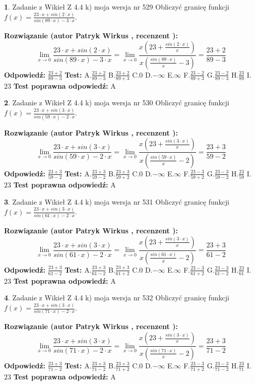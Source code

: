 \documentclass[12pt, a4paper]{article}
\theoremstyle{definition} %
\newtheorem{zad}{}
\newcommand{\zadStart}[1]{\begin{zad}#1\newline}
\newcommand{\zadStop}{\end{zad}}
\newcommand{\rozwStart}[2]{\noindent \textbf{Rozwiązanie (autor #1 , recenzent #2): }\newline}
\newcommand{\rozwStop}{\newline}
\newcommand{\odpStart}{\noindent \textbf{Odpowiedź:}\newline}
\newcommand{\odpStop}{\newline}
\newcommand{\testStart}{\noindent \textbf{Test:}\newline}
\newcommand{\testStop}{\newline}
\newcommand{\kluczStart}{\noindent \textbf{Test poprawna odpowiedź:}\newline}
\newcommand{\kluczStop}{\newline}
\begin{document}
\zadStart{Zadanie z Wikieł Z 4.4 k) moja wersja nr 529}
Obliczyć granicę funkcji $f(x)=\frac{23\cdot x +sin(2\cdot x)}{sin(89\cdot x) -3\cdot x}$.
\zadStop
\rozwStart{Patryk Wirkus}{}
$$\lim\limits_{x\to 0}\frac{23\cdot x +sin(2\cdot x)}{sin(89\cdot x) -3\cdot x}
=\lim\limits_{x\to 0}\frac{x(23+\frac{sin(2\cdot x)}{x})}{x(\frac{sin(89\cdot x)}{x}-3)}
=\frac{23+2}{89-3}$$
\rozwStop
\odpStart
$\frac{23+2}{89-3}$
\odpStop
\testStart
A.$\frac{23+2}{89-3}$
B.$\frac{23+2}{89+3}$
C.$0$
D.$-\infty$
E.$\infty$
F.$\frac{23-2}{89+3}$
G.$\frac{23-2}{89-3}$
H.$\frac{23}{89}$
I.$23$
\testStop
\kluczStart
A
\kluczStop



\zadStart{Zadanie z Wikieł Z 4.4 k) moja wersja nr 530}
Obliczyć granicę funkcji $f(x)=\frac{23\cdot x +sin(3\cdot x)}{sin(59\cdot x) -2\cdot x}$.
\zadStop
\rozwStart{Patryk Wirkus}{}
$$\lim\limits_{x\to 0}\frac{23\cdot x +sin(3\cdot x)}{sin(59\cdot x) -2\cdot x}
=\lim\limits_{x\to 0}\frac{x(23+\frac{sin(3\cdot x)}{x})}{x(\frac{sin(59\cdot x)}{x}-2)}
=\frac{23+3}{59-2}$$
\rozwStop
\odpStart
$\frac{23+3}{59-2}$
\odpStop
\testStart
A.$\frac{23+3}{59-2}$
B.$\frac{23+3}{59+2}$
C.$0$
D.$-\infty$
E.$\infty$
F.$\frac{23-3}{59+2}$
G.$\frac{23-3}{59-2}$
H.$\frac{23}{59}$
I.$23$
\testStop
\kluczStart
A
\kluczStop



\zadStart{Zadanie z Wikieł Z 4.4 k) moja wersja nr 531}
Obliczyć granicę funkcji $f(x)=\frac{23\cdot x +sin(3\cdot x)}{sin(61\cdot x) -2\cdot x}$.
\zadStop
\rozwStart{Patryk Wirkus}{}
$$\lim\limits_{x\to 0}\frac{23\cdot x +sin(3\cdot x)}{sin(61\cdot x) -2\cdot x}
=\lim\limits_{x\to 0}\frac{x(23+\frac{sin(3\cdot x)}{x})}{x(\frac{sin(61\cdot x)}{x}-2)}
=\frac{23+3}{61-2}$$
\rozwStop
\odpStart
$\frac{23+3}{61-2}$
\odpStop
\testStart
A.$\frac{23+3}{61-2}$
B.$\frac{23+3}{61+2}$
C.$0$
D.$-\infty$
E.$\infty$
F.$\frac{23-3}{61+2}$
G.$\frac{23-3}{61-2}$
H.$\frac{23}{61}$
I.$23$
\testStop
\kluczStart
A
\kluczStop



\zadStart{Zadanie z Wikieł Z 4.4 k) moja wersja nr 532}
Obliczyć granicę funkcji $f(x)=\frac{23\cdot x +sin(3\cdot x)}{sin(71\cdot x) -2\cdot x}$.
\zadStop
\rozwStart{Patryk Wirkus}{}
$$\lim\limits_{x\to 0}\frac{23\cdot x +sin(3\cdot x)}{sin(71\cdot x) -2\cdot x}
=\lim\limits_{x\to 0}\frac{x(23+\frac{sin(3\cdot x)}{x})}{x(\frac{sin(71\cdot x)}{x}-2)}
=\frac{23+3}{71-2}$$
\rozwStop
\odpStart
$\frac{23+3}{71-2}$
\odpStop
\testStart
A.$\frac{23+3}{71-2}$
B.$\frac{23+3}{71+2}$
C.$0$
D.$-\infty$
E.$\infty$
F.$\frac{23-3}{71+2}$
G.$\frac{23-3}{71-2}$
H.$\frac{23}{71}$
I.$23$
\testStop
\kluczStart
A
\kluczStop
\end{document}
